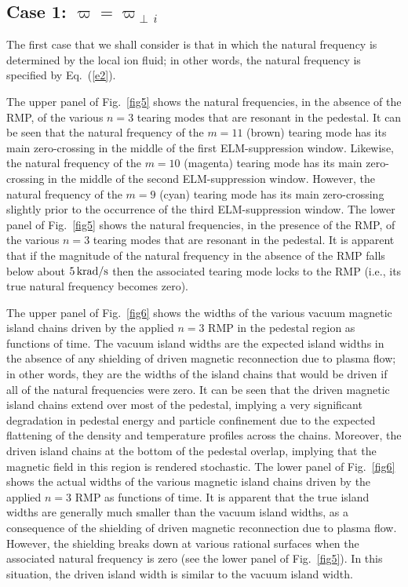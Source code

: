 \documentclass[12pt,prb,aps]{revtex4-1}
\begin{document}
\subsection{Case 1: $\varpi=\varpi_{\perp\,i}$}
The first case that we shall consider is that in which the natural frequency is determined by the local ion fluid; 
in other words, the natural frequency is specified by Eq.~(\ref{e2}). 

The upper panel of Fig.~\ref{fig5} shows the natural frequencies, in the absence of the RMP, of the various  $n=3$ tearing modes 
 that are resonant in the pedestal. It can be seen that the natural frequency of the $m=11$ (brown) tearing mode has its main zero-crossing in the middle
of the first ELM-suppression window. Likewise, the natural frequency of the $m=10$ (magenta) tearing mode has its main zero-crossing in the middle of the
second ELM-suppression window. However, the natural frequency of the $m=9$ (cyan) tearing mode  has its main zero-crossing slightly
prior to the occurrence of the third ELM-suppression window. The lower panel of Fig.~\ref{fig5} shows the natural frequencies, in the presence of the RMP, of the various $n=3$
tearing modes that are resonant in the pedestal. It is apparent that if the magnitude of the natural frequency in the absence of the RMP falls below about
$5\,{\rm krad/s}$ then the associated tearing mode locks to the RMP (i.e., its true natural frequency becomes zero). 

The upper panel of Fig.~\ref{fig6} shows the widths of the various vacuum magnetic island chains driven by the applied $n=3$ RMP in the pedestal region as functions of time.
The vacuum island widths are the  expected island widths in the absence of any shielding of driven magnetic reconnection due to
plasma flow; in other words, they are the  widths of the island chains that would be driven if all of the natural frequencies were zero. It can be seen that
the driven magnetic island chains extend over most of the pedestal, implying a very significant degradation in pedestal energy and particle confinement due to the
expected flattening of the density and temperature profiles across the chains. Moreover, the driven island chains at the
bottom of the pedestal overlap, implying that the magnetic field in this region is rendered stochastic. The lower panel
of Fig.~\ref{fig6} shows the actual widths of the various magnetic island chains driven by the applied $n=3$ RMP as functions of time. It is apparent 
that the true island widths are generally much smaller than the vacuum island widths, as a consequence of the shielding of driven magnetic
reconnection due to plasma flow. However, the shielding breaks down at various rational surfaces when the associated natural frequency is zero (see the lower panel of
Fig.~\ref{fig5}). In this situation, the driven island width is similar to the vacuum island width. 
\end{document}
